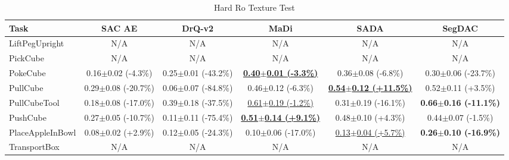 \begin{table}[htbp]
\centering
\scriptsize
\caption{Hard Ro Texture Test}
\label{tab:appendix_rotexturetest_hard}
\begin{adjustbox}{max width=\textwidth}
\begin{tabular}{l*{5}{c}}
\toprule
\textbf{Task} & \textbf{SAC AE} & \textbf{DrQ-v2} & \textbf{MaDi} & \textbf{SADA} & \textbf{SegDAC} \\
\midrule
LiftPegUpright & N/A & N/A & N/A & N/A & N/A \\
PickCube & N/A & N/A & N/A & N/A & N/A \\
PokeCube & 0.16$\pm$0.02 \scriptsize{(-4.3\%)} & 0.25$\pm$0.01 \scriptsize{(-43.2\%)} & \textbf{\underline{0.40$\pm$0.01 \scriptsize{(-3.3\%)}}} & 0.36$\pm$0.08 \scriptsize{(-6.8\%)} & 0.30$\pm$0.06 \scriptsize{(-23.7\%)} \\
PullCube & 0.29$\pm$0.08 \scriptsize{(-20.7\%)} & 0.06$\pm$0.07 \scriptsize{(-84.8\%)} & 0.46$\pm$0.12 \scriptsize{(-6.3\%)} & \textbf{\underline{0.54$\pm$0.12 \scriptsize{(+11.5\%)}}} & 0.52$\pm$0.11 \scriptsize{(+3.5\%)} \\
PullCubeTool & 0.18$\pm$0.08 \scriptsize{(-17.0\%)} & 0.39$\pm$0.18 \scriptsize{(-37.5\%)} & \underline{0.61$\pm$0.19 \scriptsize{(-1.2\%)}} & 0.31$\pm$0.19 \scriptsize{(-16.1\%)} & \textbf{0.66$\pm$0.16 \scriptsize{(-11.1\%)}} \\
PushCube & 0.27$\pm$0.05 \scriptsize{(-10.7\%)} & 0.11$\pm$0.11 \scriptsize{(-75.4\%)} & \textbf{\underline{0.51$\pm$0.14 \scriptsize{(+9.1\%)}}} & 0.48$\pm$0.10 \scriptsize{(+4.3\%)} & 0.44$\pm$0.07 \scriptsize{(-1.5\%)} \\
PlaceAppleInBowl & 0.08$\pm$0.02 \scriptsize{(+2.9\%)} & 0.12$\pm$0.05 \scriptsize{(-24.3\%)} & 0.10$\pm$0.06 \scriptsize{(-17.0\%)} & \underline{0.13$\pm$0.04 \scriptsize{(+5.7\%)}} & \textbf{0.26$\pm$0.10 \scriptsize{(-16.9\%)}} \\
TransportBox & N/A & N/A & N/A & N/A & N/A \\
\bottomrule
\end{tabular}
\end{adjustbox}
\end{table}

